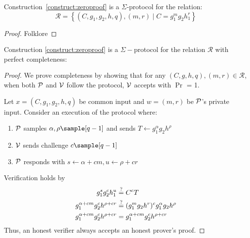 \begin{theorem}
    Construction~\ref{construct:zeroproof} is a $\Sigma$-protocol for the relation: 
    \[
    \mathcal{R} = \left\{ (C, g_1,g_2,h, q),(m,r) \; | \; C = g_1^{m}g_2h_1^{r}  \right\}
    \]    
\end{theorem}

\begin{proof}
    Folklore
\end{proof}

\begin{theorem}
    Construction \ref{construct:zeroproof} is a $\Sigma-$protocol for the relation $\mathcal{R}$ with perfect completeness: 
\end{theorem}
\begin{proof}
    We prove completeness by showing that for any $(C, g, h, q),(m,r) \in \mathcal{R}$, when both $\mathcal{P}$ and $\mathcal{V}$ follow the protocol, $\mathcal{V}$ accepts with $\Pr$ = 1.

    Let $x = (C,g_1,g_2,h,q)$ be common input and $w = (m, r)$ be $\mathcal{P}$'s private input. Consider an execution of the protocol where:
    \begin{enumerate}
        \item $\mathcal{P}$ samples $\alpha, \rho \sample [q-1]$ and sends $T \gets g_1^{\alpha}g_2h^{\rho}$
        \item $\mathcal{V}$ sends challenge $c \sample [q-1]$
        \item $\mathcal{P}$ responds with $s \gets \alpha+cm, u \gets \rho+cr$
    \end{enumerate}
    Verification holds by 
    \begin{align}
        g_1^sg_2^ch_1^u &\stackrel{?}{=} C^cT \notag \\
        g_1^{\alpha + cm}g_2^ch^{\rho + cr} &\stackrel{?}{=} (g_1^{m}g_2h^r)^c g_1^{\alpha}g_2h^{\rho} \notag \\
        g_1^{\alpha + cm}g_2^ch^{\rho + cr} &= g_1^{\alpha + cm}g_2^c h^{\rho + cr} \notag \\
    \end{align}
    Thus, an honest verifier always accepts an honest prover's proof.
\end{proof}


